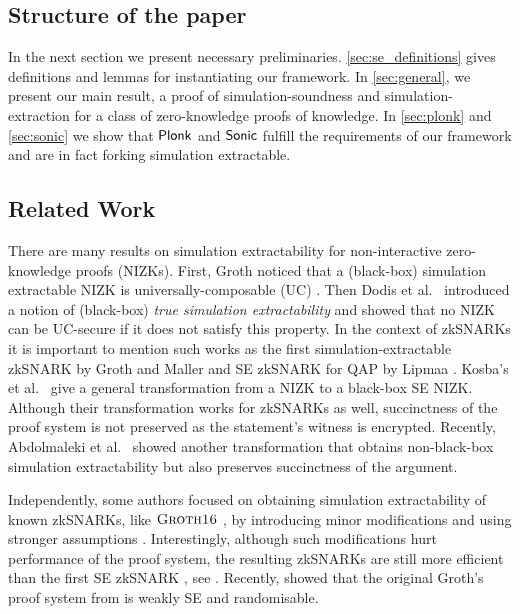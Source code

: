 \documentclass[runningheads,10pt]{llncs}
\begin{document}



\subsection{Structure of the paper}
In the next section we present necessary
preliminaries. \cref{sec:se_definitions} gives definitions and lemmas for
instantiating our framework. In \cref{sec:general}, we present our main result,
a proof of simulation-soundness and simulation-extraction for a class of zero-knowledge proofs of
knowledge. In \cref{sec:plonk} and \cref{sec:sonic} we show that $\textnormal{\textsf{Plonk}}$ and
${\textnormal{\textsf{Sonic}}}$ fulfill the requirements of our framework and are in fact forking
simulation extractable.

\subsection{Related Work}
There are many results on simulation extractability for non-interactive
zero-knowledge proofs (NIZKs). First, Groth \cite{AC:Groth07} noticed that a
(black-box) simulation extractable NIZK is universally-composable (UC)
\cite{EPRINT:Canetti00}. Then Dodis et al.~\cite{AC:DHLW10} introduced a notion
of (black-box) \emph{true simulation extractability} and showed that no NIZK can
be UC-secure if it does not satisfy this property. In the context of zkSNARKs it is
important to mention such works as the first simulation-extractable zkSNARK by
Groth and Maller \cite{C:GroMal17} and SE zkSNARK for QAP by Lipmaa
\cite{EPRINT:Lipmaa19b}. Kosba's et al.~\cite{EPRINT:KZMQCP15} give a general
transformation from a NIZK to a black-box SE NIZK. Although their transformation
works for zkSNARKs as well, succinctness of the proof system is not preserved as
the statement's witness is encrypted. Recently, Abdolmaleki et
al.~\cite{CCS:AbdRamSla20} showed another transformation that obtains
non-black-box simulation extractability but also preserves succinctness of the
argument.

Independently, some authors focused on obtaining simulation extractability of
known zkSNARKs, like $\textsc{Groth16}$ \cite{EC:Groth16}, by introducing minor
modifications and using stronger assumptions
\cite{EPRINT:BowGab18,EPRINT:AtaBag19}. Interestingly, although such
modifications hurt performance of the proof system, the resulting zkSNARKs are
still more efficient than the first SE zkSNARK \cite{C:GroMal17}, see
\cite{EPRINT:AtaBag19}. Recently, \cite{EPRINT:BKSV20} showed that the original
Groth's proof system from \cite{EC:Groth16} is weakly SE and randomisable.
\end{document}
